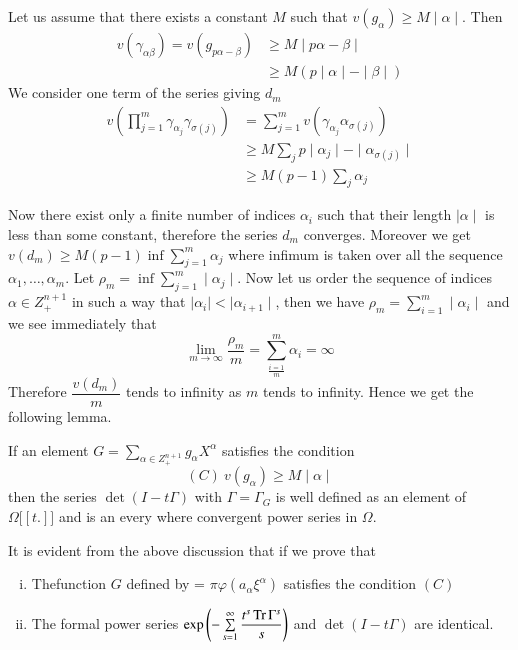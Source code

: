  Let us assume that there exists a constant $M$ such that $v
 (g_{\alpha}) \geq M \mid \alpha \mid $. Then 
 \begin{align*}
   v(\gamma_{\alpha \beta})= v (g_{p \alpha -\beta}) &\geq  M \mid  p
   \alpha - \beta \mid \\ 
   &\geq M( p \mid \alpha \mid -\mid \beta \mid )
 \end{align*}
We consider one term of the   series giving $d_m$
\begin{align*}
  v \left( \prod^{m}_{j=1} \gamma_{\alpha_{j}} \gamma_{\sigma (j)}\right) &=
  \sum^{m}_{j=1} v( \gamma_{\alpha_{j}} \alpha_{\sigma (j)})\\ 
  &\geq M \sum_{j} p \mid \alpha_{j} \mid - \mid \alpha_{\sigma(j)} \mid \\
  &\geq M(p-1) \sum_{j} \alpha_j
\end{align*}\pageoriginale

Now there exist only a finite number of indices $\alpha_i$ such that
their length $\mid \alpha \mid $  is less than some constant,
therefore the series $d_m$  converges. Moreover we get $v(d_m) \geq M
(p-1) \inf  \sum \limits^{m}_{j=1} \alpha_j$ where  infimum is taken over all
the sequence $\alpha_1,\ldots,\alpha_m$. Let 
$\rho_m =\inf \sum \limits^{m}_{j=1} \mid \alpha_j \mid$. Now let us
order the sequence of indices $\alpha \in  Z^{n+1}_{+} $ in such a way
that $\mid \alpha_i \mid < \mid \alpha_{i+1} \mid$, then we have
$\rho_m = \sum \limits ^{m}_{i=1} \mid \alpha_i \mid $ and we see
immediately that 
$$
\lim_{m \rightarrow \infty}  \frac{\rho_m}{m} =
\sum^{m}_{\frac{i=1}{m}} \alpha_i = \infty 
$$
Therefore $\dfrac{v(d_m)}{m}  $ tends to infinity as $m$ tends to
infinity. Hence we get the following lemma. 

\begin{Lemma}\label{part3:chap2:sec10:lem4}
  If an element $G= \sum \limits_{\alpha \in Z^{n+1}_{+}}  g_\alpha
  {X^{\alpha}}$ satisfies the condition  
  $$
  (C)~ v (g_\alpha) \geq M \mid \alpha \mid 
  $$
  then the series $\det (I-t \Gamma )$ with $\Gamma = \Gamma _G$ is
  well defined as an element of $\Omega \big[ [t.]\big]$ and is an
  every where convergent power series in $\Omega$.  
\end{Lemma}  

 It is evident from the above discussion  that if we prove that
\begin{enumerate}[(i)]
\item The\pageoriginale function $G$ defined by = $\pi \varphi (a_\alpha
  \xi^\alpha)$ satisfies the condition $(C)$ 
\item The formal power series $\exp \left(- \sum \limits^{\infty}_{s=1}
  \dfrac{t^s \operatorname{Tr} \Gamma^s}{s}\right)$ and $\det (I-t \Gamma)$ are identical. 
\end{enumerate}

